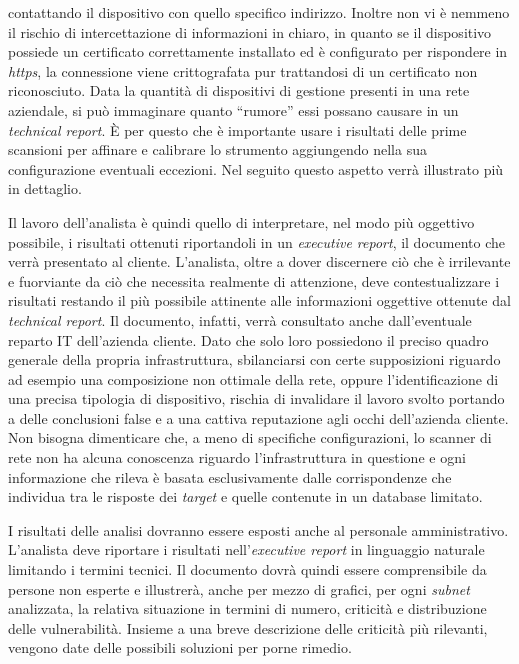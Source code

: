 \documentclass[target=bach,aauheader=]{thud}
\begin{document}
contattando il dispositivo con quello specifico indirizzo. Inoltre non vi è nemmeno il rischio di intercettazione di informazioni in chiaro, in quanto se il dispositivo possiede un certificato correttamente installato ed è configurato per rispondere in \textit{https}, la connessione viene crittografata pur trattandosi di un certificato non riconosciuto. Data la quantità di dispositivi di gestione presenti in una rete aziendale, si può immaginare quanto “rumore” essi possano causare in un \textit{technical report}. È per questo che è importante usare i risultati delle prime scansioni per affinare e calibrare lo strumento aggiungendo nella sua configurazione eventuali eccezioni. Nel seguito questo aspetto verrà illustrato più in dettaglio.

Il lavoro dell’analista è quindi quello di interpretare, nel modo più oggettivo possibile, i risultati ottenuti riportandoli in un \textit{executive report}, il documento che verrà presentato al cliente. L’analista, oltre a dover discernere ciò che è irrilevante e fuorviante da ciò che necessita realmente di attenzione, deve contestualizzare i risultati restando il più possibile attinente alle informazioni oggettive ottenute dal \textit{technical report}. Il documento, infatti, verrà consultato anche dall’eventuale reparto IT dell’azienda cliente. Dato che solo loro possiedono il preciso quadro generale della propria infrastruttura, sbilanciarsi con certe supposizioni riguardo ad esempio una composizione non ottimale della rete, oppure l’identificazione di una precisa tipologia di dispositivo, rischia di invalidare il lavoro svolto portando a delle conclusioni false e a una cattiva reputazione agli occhi dell’azienda cliente. Non bisogna dimenticare che, a meno di specifiche configurazioni, lo scanner di rete non ha alcuna conoscenza riguardo l’infrastruttura in questione e ogni informazione che rileva è basata esclusivamente dalle corrispondenze che individua tra le risposte dei \textit{target} e quelle contenute in un database limitato.

I risultati delle analisi dovranno essere esposti anche al personale amministrativo. L’analista deve riportare i risultati nell’\textit{executive report} in linguaggio naturale limitando i termini tecnici. Il documento dovrà quindi essere comprensibile da persone non esperte e illustrerà, anche per mezzo di grafici, per ogni \textit{subnet} analizzata, la relativa situazione in termini di numero, criticità e distribuzione delle vulnerabilità. Insieme a una breve descrizione delle criticità più rilevanti, vengono date delle possibili soluzioni per porne rimedio.
\end{document}
